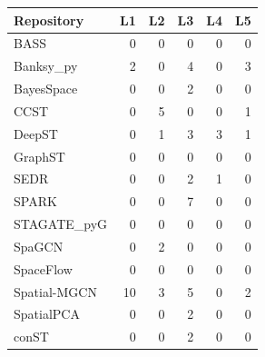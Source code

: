 \footnotesize
\begin{tabular}{lrrrrr}
\toprule
Repository & L1 & L2 & L3 & L4 & L5 \\
\midrule
BASS & 0 & 0 & 0 & 0 & 0 \\
Banksy\_py & 2 & 0 & 4 & 0 & 3 \\
BayesSpace & 0 & 0 & 2 & 0 & 0 \\
CCST & 0 & 5 & 0 & 0 & 1 \\
DeepST & 0 & 1 & 3 & 3 & 1 \\
GraphST & 0 & 0 & 0 & 0 & 0 \\
SEDR & 0 & 0 & 2 & 1 & 0 \\
SPARK & 0 & 0 & 7 & 0 & 0 \\
STAGATE\_pyG & 0 & 0 & 0 & 0 & 0 \\
SpaGCN & 0 & 2 & 0 & 0 & 0 \\
SpaceFlow & 0 & 0 & 0 & 0 & 0 \\
Spatial-MGCN & 10 & 3 & 5 & 0 & 2 \\
SpatialPCA & 0 & 0 & 2 & 0 & 0 \\
conST & 0 & 0 & 2 & 0 & 0 \\
\bottomrule
\end{tabular}
